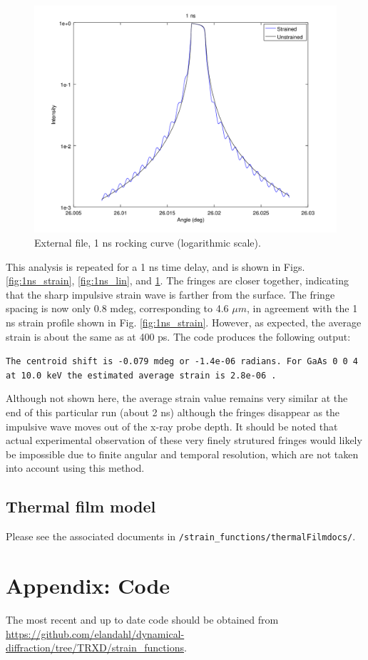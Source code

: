 \documentclass[letterpaper,11pt]{article}
\begin{document}
\begin{figure}
\begin{centering}
\includegraphics[scale=0.65]{1ns_log.png}
\caption{External file, 1 ns rocking curve (logarithmic scale).}
\label{fig:1ns_log}
\end{centering}
\end{figure}

This analysis is repeated for a 1 ns time delay, and is shown in Figs. \ref{fig:1ns_strain}, \ref{fig:1ns_lin}, and \ref{fig:1ns_log}. The fringes are closer together, indicating that the sharp impulsive strain wave is farther from the surface.  The fringe spacing is now only 0.8 mdeg, corresponding to 4.6 $\mu m$, in agreement with the 1 ns strain profile shown in Fig. \ref{fig:1ns_strain}.  However, as expected, the average strain is about the same as at 400 ps.  The code produces the following output:  

\medskip
\noindent
\texttt{The centroid shift is -0.079 mdeg or -1.4e-06 radians.
For GaAs 0 0 4 at 10.0 keV the estimated average strain is 2.8e-06 .}
\medskip

Although not shown here, the average strain value remains very similar at the end of this particular run (about 2 ns) although the fringes disappear as the impulsive wave moves out of the x-ray probe depth.  It should be noted that actual experimental observation of these very finely strutured fringes would likely be impossible due to finite angular and temporal resolution, which are not taken into account using this method.

\newpage

\subsection{Thermal film model}
Please see the associated documents in \texttt{/strain\_functions/thermalFilmdocs/}.

\section*{Appendix: Code}

The most recent and up to date code should be obtained from \url{https://github.com/elandahl/dynamical-diffraction/tree/TRXD/strain_functions}.  

 
% 
\end{document}

